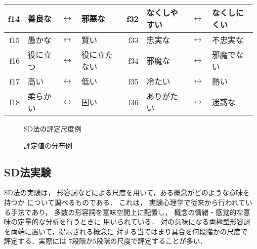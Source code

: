 \begin{table}[tb]
\begin{center}
\begin{small}
\begin{tabular}{|rlcl|rlcl|}
f14 &   善良な        & $\longleftrightarrow$  &  邪悪な        & f32  & なくしやすい  &$\longleftrightarrow$  & なくしにくい     \\\hline
f15 &   愚かな        & $\longleftrightarrow$  &  賢い          & f33  & 忠実な        &$\longleftrightarrow$  & 不忠実な         \\\hline
f16 &   役に立つ      & $\longleftrightarrow$  &  役に立たない  & f34  & 邪魔な        &$\longleftrightarrow$  & 邪魔でない       \\\hline
f17 &   高い          & $\longleftrightarrow$  &  低い          & f35  & 冷たい        &$\longleftrightarrow$  & 熱い             \\\hline
f18 &   柔らかい      & $\longleftrightarrow$  &  固い          & f36  & ありがたい    &$\longleftrightarrow$  & 迷惑な           \\\hline
\end{tabular}
\end{small}
\end{center}
\vspace{0.5cm}
\end{table}



\begin{figure}[t]
\begin{center}
\end{center}

\caption{SD法の評定尺度例}

\vspace{0.2cm}

\begin{center}
\end{center}

\caption{評定値の分布例}
\end{figure}



\subsection{SD法実験}

SD法の実験は，
形容詞などによる尺度を用いて，ある概念がどのような意味を持つか
について調べるものである．
これは，
実験心理学で従来から行われている手法であり，
多数の形容詞を意味空間上に配置し，
概念の情緒・感覚的な意味の定量的な分析を行うときに
用いられている\cite{Kusumi1995,Ishizaki1994}．
対の意味になる両極型形容詞を両端に置いて，提示される概念に
対する当てはまり具合を何段階かの尺度で評定する．実際には
7段階か5段階の尺度で評定することが多い．

